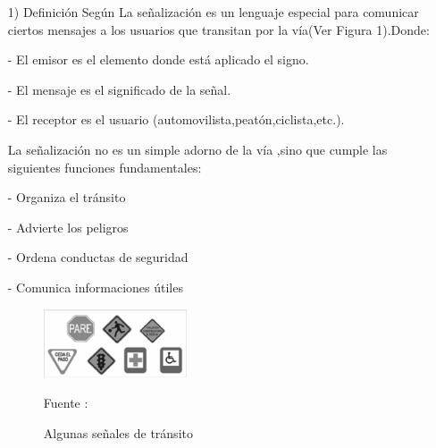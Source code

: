 \documentclass[a4paper, 12pt]{article}
\begin{document}
\begin{enumerate}
\item[1)]Definición
\vskip 0.3cm
Según \cite{dextre2012senalizacion} La señalización es un lenguaje especial para comunicar ciertos mensajes a los usuarios que transitan por la vía(Ver Figura 1).Donde:\par
- El emisor es el elemento donde está aplicado el signo.\par
- El mensaje es el significado de la señal.\par
- El receptor es el usuario (automovilista,peatón,ciclista,etc.).\par
La señalización no es un simple adorno de la vía ,sino que cumple las siguientes funciones  fundamentales:\par
- Organiza el tránsito\par
- Advierte los peligros\par
- Ordena conductas de seguridad\par
- Comunica informaciones útiles\par
\begin{figure}[ht]
\begin{center}
\includegraphics[width=0.4\textwidth]{definicion_senal}
\end{center}
\begin{center}
\caption{\small{Algunas señales de tránsito}}
{\small{Fuente : \cite{dextre2012senalizacion}}}
\end{center}
\end{figure}

\vskip 4cm


\end{enumerate}
\end{document}
